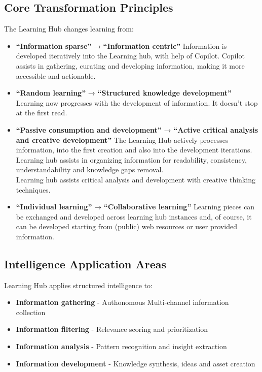 \documentclass[
  letterpaper,
  DIV=11,
  numbers=noendperiod]{scrartcl}
\providecommand{\tightlist}{%
  \setlength{\itemsep}{0pt}\setlength{\parskip}{0pt}}\usepackage{longtable,booktabs,array}
\begin{document}
\subsection{Core Transformation
Principles}\label{core-transformation-principles}

The Learning Hub changes learning from:

\begin{itemize}
\item
  \textbf{``Information sparse''} → \textbf{``Information centric''}
  Information is developed iteratively into the Learning hub, with help
  of Copilot. Copilot assists in gathering, curating and developing
  information, making it more accessible and actionable.
\item
  \textbf{``Random learning''} → \textbf{``Structured knowledge
  development''} Learning now progresses with the development of
  information. It doesn't stop at the first read.
\item
  \textbf{``Passive consumption and development''} → \textbf{``Active
  critical analysis and creative development''} The Learning Hub
  actively processes information, into the first creation and also into
  the development iterations.\\
  Learning hub assists in organizing information for readability,
  consistency, understandability and knowledge gaps removal.\\
  Learning hub assists critical analysis and development with creative
  thinking techniques.
\item
  \textbf{``Individual learning''} → \textbf{``Collaborative learning''}
  Learning pieces can be exchanged and developed across learning hub
  instances and, of course, it can be developed starting from (public)
  web resources or user provided information.
\end{itemize}

\subsection{Intelligence Application
Areas}\label{intelligence-application-areas}

Learning Hub applies structured intelligence to:

\begin{itemize}
\tightlist
\item
  \textbf{Information gathering} - Authonomous Multi-channel information
  collection
\item
  \textbf{Information filtering} - Relevance scoring and prioritization
\item
  \textbf{Information analysis} - Pattern recognition and insight
  extraction
\item
  \textbf{Information development} - Knowledge synthesis, ideas and
  asset creation
\end{itemize}
\end{document}
